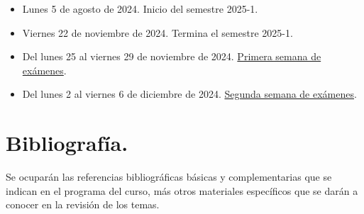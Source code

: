 \documentclass[12pt]{article}
\numberwithin{equation}{section}
\begin{document}
\begin{itemize}
\item Lunes 5 de agosto de 2024. Inicio del semestre 2025-1.
\item Viernes 22 de noviembre de 2024. Termina el semestre 2025-1.
\item Del lunes 25 al viernes 29 de noviembre de 2024. \underline{Primera semana de exámenes}.
\item Del lunes 2 al viernes 6 de diciembre de 2024. \underline{Segunda semana de exámenes}.
\end{itemize}

\section{Bibliografía.}

Se ocuparán las referencias bibliográficas básicas y complementarias que se indican en el programa del curso, más otros materiales específicos que se darán a conocer en la revisión de los temas.

\nocite{*}
\printbibliography[title=Referencias para el curso.]
\end{document}
